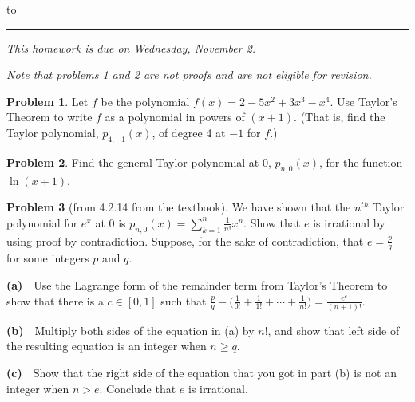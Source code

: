 \documentclass[12pt]{article}
\theoremstyle{definition}
\newtheorem{problem}{Problem}
\newenvironment{answer}{\par\medskip\bgroup\color{darkblue}}{\egroup\medskip}
\begin{document}
\hbox to 
\nointerlineskip
\vskip 2pt
\hrule height 1pt

\medskip

\centerline{\textit{This homework is due on Wednesday, November 2.}}
\smallskip
\centerline{\textit{Note that problems 1 and 2 are not proofs and are not eligible for revision.}}

\bigskip

\def\ds{\displaystyle}

\def\seq#1{\{#1_n\}_{n=1}^\infty}
\def\slim#1{{\ds\lim_{n\to\infty} #1_n}}

\begin{problem}  %
Let $f$ be the polynomial $f(x)=2-5x^2+3x^3-x^4$.  Use Taylor's Theorem to write $f$ as a
polynomial in powers of $(x+1)$.  (That is, find the Taylor polynomial, $p_{4,-1}(x)$, of degree 4 at $-1$ for $f$.)
\end{problem}

\begin{answer}
\end{answer}




\begin{problem}  %
Find the general Taylor polynomial at 0, $p_{n,0}(x)$, for the function $\ln(x+1)$.
\end{problem}

\begin{answer}
\end{answer}




\begin{problem}[from 4.2.14 from the textbook]    %
We have shown that the $n^{th}$ Taylor polynomial for $e^x$ at 0 is
$p_{n,0}(x)=\sum_{k=1}^n\frac1{n!}x^n$.
Show that $e$ is irrational by using proof by contradiction.  Suppose,
for the sake of contradiction, that $e=\frac pq$ for some integers $p$ and $q$.

\smallskip
\textbf{(a)}\ \ Use the Lagrange form of the remainder term from Taylor's Theorem to show that there is a $c\in[0,1]$
such that $\frac pq-\big(\frac1{0!}+\frac1{1!}+\cdots+\frac1{n!}\big)=\frac{e^c}{(n+1)!}$.

\smallskip
\textbf{(b)}\ \ Multiply both sides of the equation in (a) by $n!$, and show that left side of the
resulting equation is an integer when $n\ge q$.

\smallskip
\textbf{(c)}\ \  Show that the right side of the equation that
you got in part (b) is not an integer when $n>e$.  Conclude that $e$ is irrational.
\end{problem}
\end{document}
